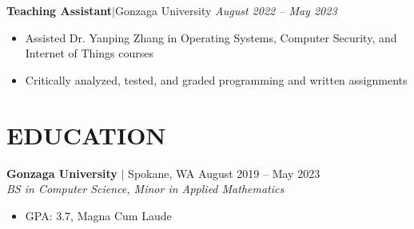 \documentclass[11pt, a4paper, roman]{moderncv}
\newcommand{\entry}[4]{
	\textbf{#2}\:$|$\:#1 
	\hfill\textit{#3}
	#4
	\vspace{2mm}
}
\newcommand{\education}[5]{
	\textbf{#1} $|$ #2
	\hfill#3
	\\\textit{#4}
	#5
	\vspace{2mm}
}
\begin{document}
\entry{Gonzaga University}{Teaching Assistant}{August 2022 -- May 2023}
{\begin{itemize}
	\item Assisted Dr. Yanping Zhang in Operating Systems, Computer Security, and Internet of Things courses
	\item Critically analyzed, tested, and graded programming and written assignments
\end{itemize}
}



\vspace*{-2mm}

\section{EDUCATION}

\education{Gonzaga University}{Spokane, WA}{August 2019 -- May 2023}{BS in Computer Science, Minor in Applied Mathematics}
	{\begin{itemize}
    		\item GPA: 3.7, Magna Cum Laude
  	\end{itemize}
}
\end{document}
